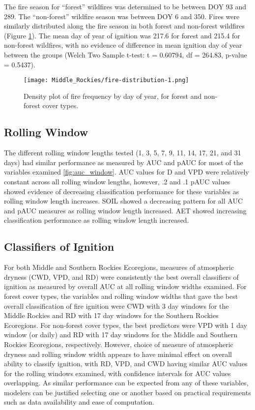 \documentclass[11pt]{article}
\begin{document}
The fire season for ``forest'' wildfires was determined to be between DOY 93 and 289.  The ``non-forest'' wildfire season was between DOY 6 and 350.  Fires were similarly distributed along the fire season in both forest and non-forest wildfires (Figure \ref{fig:fire-dens}). The mean day of year of ignition was 217.6 for forest and 215.4 for non-forest wildfires, with no evidence of difference in mean ignition day of year between the groups (Welch Two Sample t-test: t = 0.60794, df = 264.83, p-value = 0.5437).

\begin{figure}[ht]
  \texttt{[image: Middle\_Rockies/fire-distribution-1.png]}
  \caption{Density plot of fire frequency by day of year, for forest and non-forest cover types.}
  \label{fig:fire-dens}
\end{figure}


\subsection{Rolling Window}
The different rolling window lengths tested (1, 3, 5, 7, 9, 11, 14, 17, 21,  and 31 days) had similar performance as measured by AUC and pAUC for most of the variables examined \ref{fig:auc_window}. AUC values for D and VPD were relatively constant across all rolling window lengths, however, .2 and .1 pAUC values showed evidence of decreasing classification performance for these variables as rolling window length increases.  SOIL showed a decreasing pattern for all AUC and pAUC measures as rolling window length increased.  AET showed increasing classification performance as rolling window length increased.  

\subsection{Classifiers of Ignition}

For both Middle and Southern Rockies Ecoregions, measures of atmospheric dryness (CWD, VPD, and RD) were consistently the best overall classifiers of ignition as measured by overall AUC at all rolling window widths examined.  For forest cover types, the variables and rolling window widths that gave the best overall classification of fire ignition were CWD with 3 day windows for the Middle Rockies and RD with 17 day windows for the Southern Rockies Ecoregions.  For non-forest cover types, the best predictors were VPD with 1 day window (or daily) and RD with 17 day windows for the Middle and Southern Rockies Ecoregions, respectively.  However, choice of measure of atmospheric dryness and rolling window width appears to have minimal effect on overall ability to classify ignition, with RD, VPD, and CWD having similar AUC values for the rolling windows examined, with confidence intervals for AUC values overlapping.  As similar performance can be expected from any of these variables, modelers can be justified selecting one or another based on practical requirements such as data availability and ease of computation.
\end{document}

